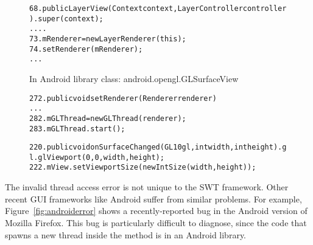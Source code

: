 \begin{figure}[t]
\hspace{6mm}{In class: org.mozilla.gecko.gfx.LayerView}
\vspace{-2mm}
\begin{CodeOut}
\begin{alltt}
68.  public LayerView(Context context, LayerController controller) .     super(context);
        ....
73.     mRenderer = new LayerRenderer(this);
74.     setRenderer(mRenderer);
        ...
     \ttrcb
\end{alltt}
\end{CodeOut}
\hspace{6mm} {In Android library class: android.opengl.GLSurfaceView}
\vspace{-2mm}
\begin{CodeOut}
\begin{alltt}
272. public void setRenderer(Renderer renderer) \ttlcb
        ...
282.    mGLThread = new GLThread(renderer);
283.    mGLThread.start();   
     \ttrcb
\end{alltt}
\end{CodeOut}
 \hspace{6mm}{In class: org.mozilla.gecko.gfx.LayerRenderer}
\vspace{-2mm}
\begin{CodeOut}
\begin{alltt}
220. public void onSurfaceChanged(GL10 gl, int width, int height) .    gl.glViewport(0, 0, width, height);
222.    mView.setViewportSize(new IntSize(width, height));
     \ttrcb
\end{alltt}
\end{CodeOut}
\tinystep
\vspace*{-3.0ex}  %
\end{figure}

The invalid thread access error is not unique to the SWT framework. Other recent GUI frameworks
like Android suffer from similar problems. For example, 
Figure~\ref{fig:androiderror} shows a recently-reported bug in the Android version of Mozilla Firefox.
This bug is particularly difficult to diagnose, 
since the code that spawns a new thread inside the  method is
in an Android library.

